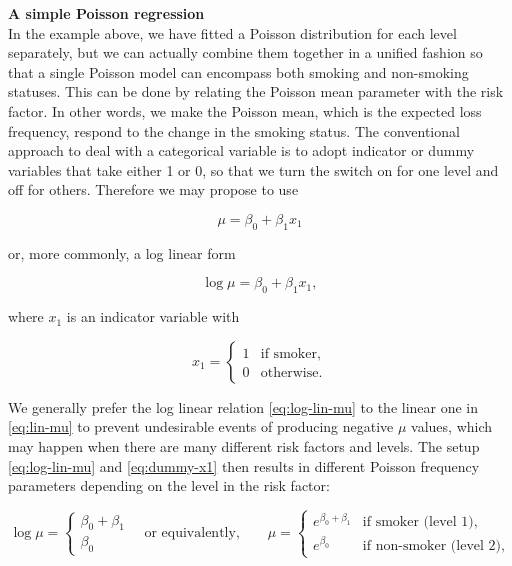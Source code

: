 \documentclass[]{book}
\theoremstyle{definition}
\theoremstyle{definition}
\theoremstyle{definition}
\theoremstyle{remark}
\begin{document}
\textbf{A simple Poisson regression}\\
In the example above, we have fitted a Poisson distribution for each
level separately, but we can actually combine them together in a unified
fashion so that a single Poisson model can encompass both smoking and
non-smoking statuses. This can be done by relating the Poisson mean
parameter with the risk factor. In other words, we make the Poisson
mean, which is the expected loss frequency, respond to the change in the
smoking status. The conventional approach to deal with a categorical
variable is to adopt indicator or dummy variables that take either 1 or
0, so that we turn the switch on for one level and off for others.
Therefore we may propose to use

\begin{equation}
\mu=\beta_0+\beta_1 x_1
\label{eq:lin-mu}
\end{equation}

or, more commonly, a log linear form

\begin{equation}
\log \mu=\beta_0+\beta_1 x_1,
\label{eq:log-lin-mu}
\end{equation}

where \(x_1\) is an indicator variable with

\begin{equation}
x_1=
\begin{cases}
     1 & \text{if smoker}, \\
     0 & \text{otherwise}.
\end{cases}
\label{eq:dummy-x1}
\end{equation}

We generally prefer the log linear relation \eqref{eq:log-lin-mu} to the
linear one in \eqref{eq:lin-mu} to prevent undesirable events of producing
negative \(\mu\) values, which may happen when there are many different
risk factors and levels. The setup \eqref{eq:log-lin-mu} and
\eqref{eq:dummy-x1} then results in different Poisson frequency parameters
depending on the level in the risk factor:

\begin{equation}
\log \mu=
\begin{cases}
     \beta_0+\beta_1 \\
     \beta_0 
\end{cases}
\quad \text{or equivalently,}\qquad \mu= \begin{cases}
     e^{\beta_0+\beta_1} & \text{if smoker (level 1)}, \\
     e^{\beta_0} & \text{if non-smoker (level 2)},
\end{cases} 
\label{eq:ind-mu}
\end{equation}
\end{document}

